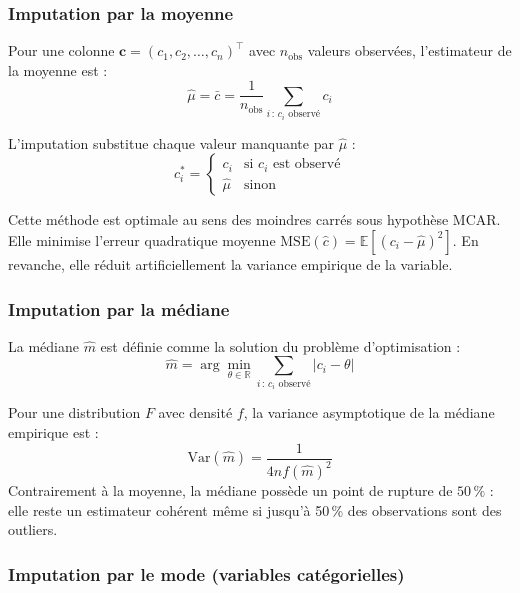 \documentclass[12pt,a4paper]{article}
\newcounter{propcount}[section]
\newenvironment{proposition}[1]{%
  \stepcounter{propcount}%
  \begin{tcolorbox}[propstyle={Proposition \thesection.\thepropcount\ — #1}]
}{%
  \end{tcolorbox}
}
\newenvironment{remarque}[1]{%
  \begin{tcolorbox}[remarkstyle={Remarque — #1}]
}{%
  \end{tcolorbox}
}
\begin{document}
\subsubsection{Imputation par la moyenne}

Pour une colonne $\mathbf{c} = (c_1, c_2, \ldots, c_n)^{\top}$ avec
$n_{\text{obs}}$ valeurs observées, l'estimateur de la moyenne est :
\begin{equation}
  \hat{\mu} = \bar{c} = \frac{1}{n_{\text{obs}}} \sum_{i \,:\, c_i \text{ observé}} c_i
\end{equation}

L'imputation substitue chaque valeur manquante par $\hat{\mu}$ :
\begin{equation}
  c_i^* = \begin{cases} c_i & \text{si } c_i \text{ est observé} \\
  \hat{\mu} & \text{sinon} \end{cases}
\end{equation}

\begin{remarque}{Biais de l'imputation par la moyenne}
Cette méthode est optimale au sens des moindres carrés sous hypothèse MCAR.
Elle minimise l'erreur quadratique moyenne $\text{MSE}(\hat{c}) =
\mathbb{E}[(c_i - \hat{\mu})^2]$. En revanche, elle réduit artificiellement
la variance empirique de la variable.
\end{remarque}

\subsubsection{Imputation par la médiane}

La médiane $\hat{m}$ est définie comme la solution du problème d'optimisation :
\begin{equation}
  \hat{m} = \arg\min_{\theta \in \mathbb{R}} \sum_{i \,:\, c_i \text{ observé}} |c_i - \theta|
\end{equation}

\begin{proposition}{Robustesse de la médiane}
Pour une distribution $F$ avec densité $f$, la variance asymptotique de la médiane
empirique est :
\[
  \text{Var}(\hat{m}) = \frac{1}{4 n f(\hat{m})^2}
\]
Contrairement à la moyenne, la médiane possède un point de rupture de $50\,\%$ :
elle reste un estimateur cohérent même si jusqu'à 50\,\% des observations sont
des outliers.
\end{proposition}

\subsubsection{Imputation par le mode (variables catégorielles)}
\end{document}
